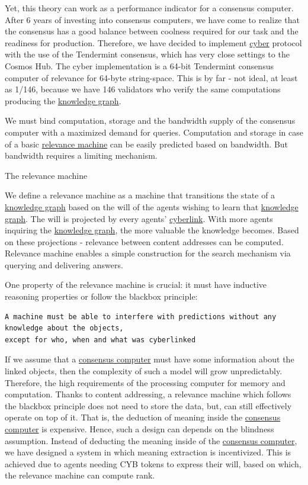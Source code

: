 \documentclass[8pt,oneside]{amsart}
\makeatletter
\newcommand{\linkgreen}[2]{\href{#1}{\color{green}{#2}}}
\renewcommand\subsection{\@startsection{subsection}
                                    {2}{\z@}
                                    {-3.25ex\@plus -1ex \@minus -.2ex}
                                    {0ex \@plus .2ex}
                                    {\play\Large}
                        }
\newcommand{\titleSection}[1]{\subsection{#1}}
\newcommand{\code}[1]{{\PlayBold #1}}
\makeatother
\begin{document}
Yet, this theory can work as a performance indicator for a consensus computer. After 6 years of investing into consensus computers, we have come to realize that the \linkgreen{https://ipfs.io/ipfs/QmaMtD7xDgghqgjN62zWZ5TBGFiEjGQtuZBjJ9sMh816KJ}{Tendermint} consensus has a good balance between coolness required for our task and the readiness for production. Therefore, we have decided to implement {\hyperref[cyber]{cyber}} protocol with the use of the Tendermint consensus, which has very close settings to the Cosmos Hub. The \code{cyber} implementation is a 64-bit Tendermint consensus computer of relevance for 64-byte string-space. This is by far - not ideal, at least as 1/146, because we have 146 validators who verify the same computations producing the {\hyperref[knowledge-graph]{knowledge graph}}.

We must bind computation, storage and the bandwidth supply of the consensus computer with a maximized demand for queries. Computation and storage in case of a basic {\hyperref[relevance-machine]{relevance machine}} can be easily predicted based on bandwidth. But bandwidth requires a limiting mechanism.

\titleSection{The relevance machine}\label{relevance-machine}

We define a relevance machine as a machine that transitions the state of a {\hyperref[knowledge-graph]{knowledge graph}} based on the will of the agents wishing to learn that {\hyperref[knowledge-graph]{knowledge graph}}. The will is projected by every agents' {\hyperref[cyberlinks]{cyberlink}}. With more agents inquiring the {\hyperref[knowledge-graph]{knowledge graph}}, the more valuable the knowledge becomes. Based on these projections - relevance between content addresses can be computed. Relevance machine enables a simple construction for the search mechanism via querying and delivering answers.

One property of the relevance machine is crucial: it must have inductive reasoning properties or follow the blackbox principle:

\begin{lstlisting}
A machine must be able to interfere with predictions without any knowledge about the objects,
except for who, when and what was cyberlinked
\end{lstlisting}

If we assume that a {\hyperref[consensus-computer]{consensus computer}} must have some information about the linked objects, then the complexity of such a model will grow unpredictably. Therefore, the high requirements of the processing computer for memory and computation. Thanks to content addressing, a relevance machine which follows the blackbox principle does not need to store the data, but, can still effectively operate on top of it. That is, the deduction of meaning inside the {\hyperref[consensus-computer]{consensus computer}} is expensive. Hence, such a design can depends on the blindness assumption. Instead of deducting the meaning inside of the {\hyperref[consensus-computer]{consensus computer}}, we have designed a system in which meaning extraction is incentivized. This is achieved due to agents needing CYB tokens to express their will, based on which, the relevance machine can compute rank.
\end{document}
